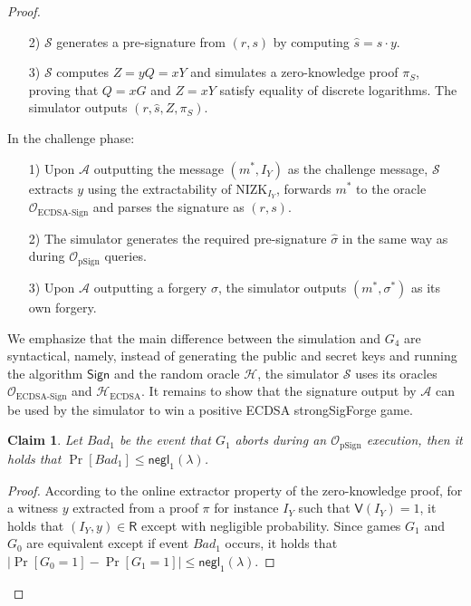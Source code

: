 \documentclass{llncs}
\newtheorem{Claim}{Claim}
\begin{document}
\begin{proof}
\begin{itemize}
\begin{itemize}
\item[2)] $\mathcal{S}$ generates a pre-signature from $(r, s)$ by computing $\hat{s} = s \cdot y$.

\item[3)] $\mathcal{S}$ computes $Z=yQ=xY$ and simulates a zero-knowledge proof $\pi_S$, proving that $Q=xG$ and $Z=xY$ satisfy equality of discrete logarithms. The simulator outputs $(r, \hat{s}, Z, \pi_S)$.
\end{itemize}

In the challenge phase:
\begin{itemize}
\item[1)] Upon $\mathcal{A}$ outputting the message $(m^*,I_Y)$ as the challenge message, $\mathcal{S}$ extracts $y$ using the extractability of NIZK$_{I_Y}$, forwards $m^*$ to the oracle $\mathcal{O}_{\text{ECDSA-Sign}}$ and parses the signature as $(r, s)$.

\item[2)] The simulator generates the required pre-signature $\hat{\sigma}$ in the same way as during $\mathcal{O}_{\text{pSign}}$ queries.

\item[3)] Upon $\mathcal{A}$ outputting a forgery $\sigma$, the simulator outputs $(m^*, \sigma^*)$ as its own forgery.
\end{itemize}
\end{itemize}

We emphasize that the main difference between the simulation and $G_4$ are syntactical, namely, instead of generating the public and secret keys and running the algorithm $\mathsf{Sign}$ and the random oracle $\mathcal{H}$, the simulator $\mathcal{S}$ uses its oracles $\mathcal{O}_{\text{ECDSA-Sign}}$ and $\mathcal{H}_{\text{ECDSA}}$. It remains to show that the signature output by $\mathcal{A}$ can be used by the simulator to win a positive ECDSA strongSigForge game.

\begin{Claim}
Let $Bad_1$ be the event that $G_1$ aborts during an $\mathcal{O}_{\text{pSign}}$ execution, then it holds that $\Pr[Bad_1] \leq \mathsf{negl}_1(\lambda)$.
\end{Claim}

\begin{proof}
According to the online extractor property of the zero-knowledge proof, for a witness $y$ extracted from a proof $\pi$ for instance $I_Y$ such that $\mathsf{V}(I_Y) = 1$, it holds that $(I_Y, y) \in \mathsf{R}$ except with negligible probability. Since games $G_1$ and $G_0$ are equivalent except if event $Bad_1$ occurs, it holds that 
$|\Pr[G_0 = 1] - \Pr[G_1 = 1]|\leq\mathsf{negl}_1(\lambda).$
\end{proof}


\end{proof}
\end{document}
